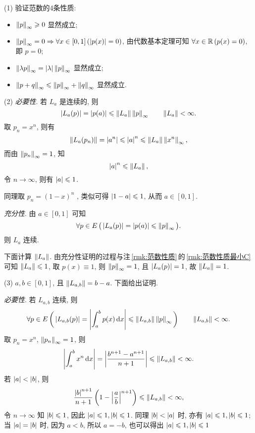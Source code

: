     \begin{Proof}
        (1) 验证范数的4条性质:
        \begin{itemize}
            \item $ \left\| p \right\|_{\infty}\geqslant 0 $ 显然成立;
            \item $ \left\| p \right\|_{\infty}=0 \Rightarrow \forall x\in [0, 1]\,(\left| p(x) \right| =0) $, 由代数基本定理可知 $ \forall x\in\mathbb{R}\,(p(x)=0) $, 即 $ p=0 $;
            \item $ \left\| \lambda p \right\|_{\infty}=\left| \lambda \right| \left\| p \right\|_{\infty} $ 显然成立;
            \item $ \left\| p+q \right\|_{\infty}\leqslant\left\| p \right\|_{\infty}+\left\| q \right\|_{\infty} $ 显然成立.
        \end{itemize}

        (2) \textsl{必要性}. 若 $ L_{a} $ 是连续的, 则
        \[
            \left| L_{a}(p) \right| =\left| p(a) \right| \leqslant \left\| L_{a} \right\|\left\| p \right\|_{\infty}\qquad\left\| L_{a} \right\|<\infty.
        \]
        取 $ p_{n}=x^{n} $, 则有
        \[
            \left\| L_{a}(p_{n}) \right\|=\left| a^{n} \right| \leqslant\left| a \right| ^{n}\leqslant \left\| L_{a} \right\|\left\| x^{n} \right\|_{\infty},
        \]
        而由 $ \left\| p_{n} \right\|_{\infty}=1 $, 知
        \[
            \left| a \right| ^{n}\leqslant\left\| L_{a} \right\|,
        \]
        令 $ n\to\infty $, 则有 $ \left| a \right| \leqslant1 $.

        同理取 $ p_{n}=(1-x)^{n} $ , 类似可得 $ \left| 1-a \right| \leqslant1 $, 从而 $ a\in[0, 1] $.

        \textsl{充分性}. 由 $ a\in[0, 1] $ 可知
        \[
            \forall p\in E\,\big(\left| L_{a}(p) \right| =\left| p(a) \right| \leqslant\left\| p \right\|_{\infty}\big).
        \]
        则 $ L_{a} $ 连续.

        下面计算 $ \left\| L_{a} \right\| $. 由充分性证明的过程与注\,\ref{rmk:范数性质}\,的\,\ref{rmk:范数性质最小C}\,可知 $ \left\| L_{a} \right\|\leqslant1 $, 取 $ p(x)\equiv 1 $, 则 $ \left\| p \right\|_{\infty}=1 $, 且 $ \left| L_{a}(p) \right| =1 $, 故 $ \left\| L_{a} \right\|=1 $.

        (3) $ a, b\in[0, 1] $, 且 $ \left\| L_{a, b} \right\|=b-a $. 下面给出证明.

        \textsl{必要性}. 若 $ L_{a, b} $ 连续, 则
        \[
            \forall p\in E\,\bigg(\left| L_{a, b}(p) \right| =\left| \int_{a}^{b}p(x)\,\mathrm{d} x \right| \leqslant \left\| L_{a, b} \right\|\left\| p \right\|_{\infty}\bigg)\qquad \left\| L_{a, b} \right\|<\infty.
        \]
        取 $ p_{n}=x^{n} $, $ \left\| p_{n} \right\|_{\infty}=1 $, 则
        \[
            \left| \int_{a}^{b}x^{n}\,\mathrm{d} x \right| =\left| \frac{b^{n+1}-a^{n+1}}{n+1} \right| \leqslant\left\| L_{a, b} \right\|<\infty.
        \]
        若 $ \left| a \right| <\left| b \right|  $, 则
        \[
            \frac{\left| b \right| ^{n+1}}{n+1}\left( 1-\left| \frac{a}{b} \right| ^{n+1} \right) \leqslant \left\| L_{a, b} \right\|<\infty,
        \]
        令 $ n\to\infty $ 知 $ \left| b \right| \leqslant1 $, 因此 $ \left| a \right| \leqslant1, \left| b \right| \leqslant1 $. 同理 $ \left| b \right| <\left| a \right|  $ 时, 亦有 $ \left| a \right| \leqslant1, \left| b \right| \leqslant1 $; 当 $ \left| a \right| =\left| b \right|  $ 时, 因为 $ a<b $, 所以 $ a=-b $, 也可以得出 $ \left| a \right| \leqslant1, \left| b \right| \leqslant1 $


\end{Proof}
